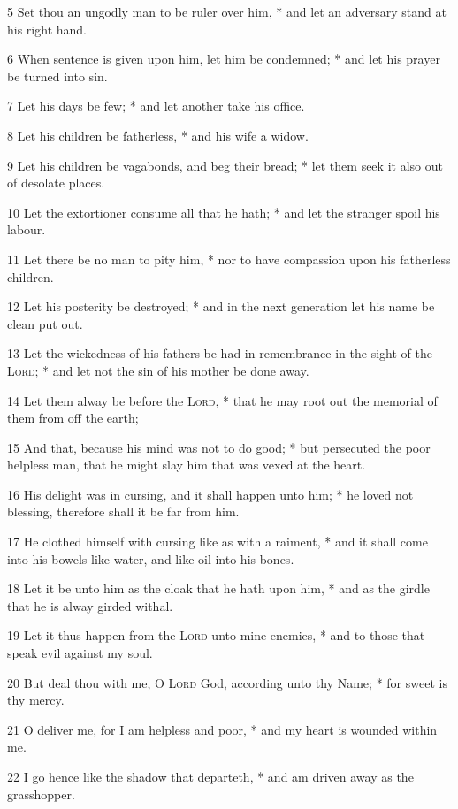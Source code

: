 5 Set thou an ungodly man to be ruler over him, * and let an adversary stand at his right hand.\par
6 When sentence is given upon him, let him be condemned; * and let his prayer be turned into sin.\par
7 Let his days be few; * and let another take his office.\par
8 Let his children be fatherless, * and his wife a widow.\par
9 Let his children be vagabonds, and beg their bread; * let them seek it also out of desolate places.\par
10 Let the extortioner consume all that he hath; * and let the stranger spoil his labour.\par
11 Let there be no man to pity him, * nor to have compassion upon his fatherless children.\par
12 Let his posterity be destroyed; * and in the next generation let his name be clean put out.\par
13 Let the wickedness of his fathers be had in remembrance in the sight of the {\textsc{Lord}}; * and let not the sin of his mother be done away.\par
14 Let them alway be before the {\textsc{Lord}}, * that he may root out the memorial of them from off the earth;\par
15 And that, because his mind was not to do good; * but persecuted the poor helpless man, that he might slay him that was vexed at the heart.\par
16 His delight was in cursing, and it shall happen unto him; * he loved not blessing, therefore shall it be far from him.\par
17 He clothed himself with cursing like as with a raiment, * and it shall come into his bowels like water, and like oil into his bones.\par
18 Let it be unto him as the cloak that he hath upon him, * and as the girdle that he is alway girded withal.\par
19 Let it thus happen from the {\textsc{Lord}} unto mine enemies, * and to those that speak evil against my soul.\par
20 But deal thou with me, O {\textsc{Lord}} God, according unto thy Name; * for sweet is thy mercy.\par
21 O deliver me, for I am helpless and poor, * and my heart is wounded within me.\par
22 I go hence like the shadow that departeth, * and am driven away as the grasshopper.\par
